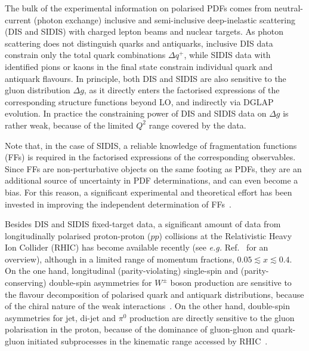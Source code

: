 The bulk of the experimental information on polarised PDFs comes from 
neutral-current (photon exchange) inclusive and semi-inclusive deep-inelastic
scattering (DIS and SIDIS) with charged lepton beams and nuclear targets. 
%
As photon scattering does not distinguish quarks and antiquarks, inclusive DIS 
data constrain only the total quark combinations $\Delta q^+$, 
while SIDIS data with identified pions or kaons in the final state 
constrain individual quark and antiquark flavours. 
%
In principle, both DIS and SIDIS are also sensitive to the gluon 
distribution $\Delta g$, as it directly enters the factorised expressions of
the corresponding structure functions beyond LO, and indirectly via DGLAP 
evolution.
%
In practice the constraining power of DIS and SIDIS data on $\Delta g$ is 
rather weak, because of the limited $Q^2$ range covered by the data. 

Note that, in the case of SIDIS, a reliable knowledge of fragmentation 
functions (FFs) is required in the factorised expressions of the 
corresponding observables. 
%
Since FFs are non-perturbative objects on the same footing as PDFs, they are 
an additional source of uncertainty in PDF determinations, and can  
even become a bias.
%
For this reason, a significant experimental and theoretical effort has been
invested in improving the independent determination of 
FFs~\cite{deFlorian:2014xna,deFlorian:2017lwf,
Hirai:2016loo,Sato:2016tuz,Nocera:2017qgb,Bertone:2017xsf,Ethier:2017zbq}.

Besides DIS and SIDIS fixed-target data, a significant amount of data from
longitudinally polarised proton-proton ($pp$) collisions at the Relativistic 
Heavy Ion Collider (RHIC) has become available recently (see {\it e.g.} 
Ref.~\cite{Aschenauer:2015eha} for an overview), although in a limited range 
of momentum fractions, $0.05\lesssim x \lesssim 0.4$.
%
On the one hand, longitudinal (parity-violating) single-spin and 
(parity-conserving) double-spin asymmetries for $W^\pm$ boson production are 
sensitive to the flavour decomposition of polarised quark and antiquark 
distributions, because of the chiral nature of the weak 
interactions~\cite{Bourrely:1993dd}. 
%
On the other hand, double-spin asymmetries for jet, di-jet and $\pi^0$ 
production are directly sensitive to the gluon polarisation in 
the proton, because of the dominance of gluon-gluon and quark-gluon initiated 
subprocesses in the kinematic range accessed by RHIC~\cite{Bourrely:1990pz}.

